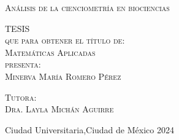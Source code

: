 \documentclass[letterpaper,12pt,oneside]{book}
\begin{document}
\begin{titlepage}
\begin{minipage}[c][0.81\textheight][t]{0.75\textwidth}
\begin{center}
            {\large\scshape Análisis de la cienciometría en biociencias}\\[.2in]

            \vspace{2cm}            

            \textsc{\LARGE T\hspace{1.5cm}E\hspace{1.5cm}S\hspace{1.5cm}I\hspace{1.5cm}S}\\[0.5cm]
            \textsc{\large que para obtener el t\'itulo de:}\\[0.5cm]
            \textsc{\large Matemáticas Aplicadas}\\[0.5cm]
            \textsc{\large presenta:}\\[0.5cm]
            \textsc{\large {Minerva María Romero Pérez}}\\[2cm]          

            \vspace{0.5cm}

            {\large\scshape Tutora:\\[0.3cm] {Dra. Layla Michán Aguirre }}\\[.2in]

            \vspace{0.5cm}

            \large{Ciudad Universitaria,Ciudad de México}{ }{2024}
        \end{center}
    \end{minipage}
\end{titlepage}


\mainmatter
\tableofcontents




\appendix


\backmatter
\printbibliography
\end{document}
